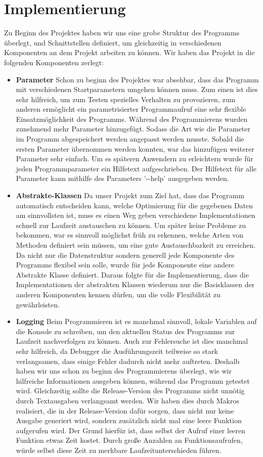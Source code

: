 \documentclass[
	12pt,
	a4paper,
	BCOR10mm,
	DIV14,
	headsepline,
]{scrreprt}
\begin{document}
\section{Implementierung}
	Zu Beginn des Projektes haben wir uns eine grobe Struktur des Programms überlegt, und Schnittstellen definiert, um gleichzeitig in verschiedenen Komponenten an dem Projekt arbeiten zu können. Wir haben das Projekt in die folgenden Komponenten zerlegt:
	\begin{itemize}
		\item \textbf{Parameter} Schon zu beginn des Projektes war absehbar, dass das Programm mit verschiedenen Startparametern umgehen können muss. Zum einen ist dies sehr hilfreich, um zum Testen spezielles Verhalten zu provozieren, zum anderen ermöglicht ein parametrisierter Programmaufruf eine sehr flexible Einsatzmöglichkeit des Programms. Während des Programmierens wurden zunehmend mehr Parameter hinzugefügt. Sodass die Art wie die Parameter im Programm abgespeichert werden angepasst werden musste. Sobald die ersten Parameter übernommen werden konnten, war das hinzufügen weiterer Parameter sehr einfach. Um es späteren Anwendern zu erleichtern wurde für jeden Programmparameter ein Hilfetext aufgeschrieben. Der Hilfetext für alle Parameter kann mithilfe des Parameters '-{}-help' ausgegeben werden.
		\item \textbf{Abstrakte-Klassen} Da unser Projekt zum Ziel hat, dass das Programm automatisch entscheiden kann, welche Optimierung für die gegebenen Daten am sinnvollsten ist, muss es einen Weg geben verschiedene Implementationen schnell zur Laufzeit austauschen zu können. Um später keine Probleme zu bekommen, war es sinnvoll möglichst früh zu erkennen, welche Arten von Methoden definiert sein müssen, um eine gute Austauschbarkeit zu erreichen. Da nicht nur die Datenstruktur sondern generell jede Komponente des Programms flexibel sein solle, wurde für jede Komponente eine andere Abstrakte Klasse definiert. Daraus folgte für die Implementierung, dass die Implementationen der abstrakten Klassen wiederum nur die Basisklassen der anderen Komponenten kennen dürfen, um die volle Flexibilität zu gewährleisten.
		\item \textbf{Logging} Beim Programmieren ist es manchmal sinnvoll, lokale Variablen auf die Konsole zu schreiben, um den aktuellen Status des Programms zur Laufzeit nachverfolgen zu können. Auch zur Fehlersuche ist dies manchmal sehr hilfreich, da Debugger die Ausführungszeit teilweise so stark verlangsamen, dass einige Fehler dadurch nicht mehr auftreten. Deshalb haben wir uns schon zu beginn des Programmierens überlegt, wie wir hilfreiche Informationen ausgeben können, während das Programm getestet wird. Gleichzeitig sollte die Release-Version des Programms nicht unnötig durch Textausgaben verlangsamt werden. Wir haben dies durch Makros realisiert, die in der Release-Version dafür sorgen, dass nicht nur keine Ausgabe generiert wird, sondern zusätzlich nicht mal eine leere Funktion aufgerufen wird. Der Grund hierfür ist, dass selbst der Aufruf einer leeren Funktion etwas Zeit kostet. Durch große Anzahlen an Funktionsaufrufen, würde selbst diese Zeit zu merkbare Laufzeitunterschieden führen.

\end{itemize}
\end{document}
